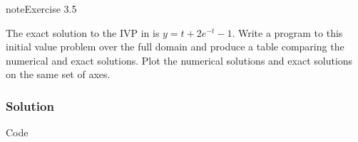 \documentclass[letterpaper,10pt,english]{jupyterBook}
\begin{document}
\begin{sphinxadmonition}{note}{Exercise 3.5}

\sphinxAtStartPar
The exact solution to the IVP in {\hyperref[\detokenize{3_IRKs/3.4_IRK_exercises:ex3-4}]{}} is \(y = t + 2e^{-t} - 1\). Write a program to this initial value problem over the full domain and produce a table comparing the numerical and exact solutions. Plot the numerical solutions and exact solutions on the same set of axes.
\subsubsection*{Solution}

\sphinxAtStartPar
Code

\begin{sphinxVerbatim}[commandchars=\\\{\}]
   
   


\end{sphinxVerbatim}
\end{sphinxadmonition}
\end{document}
